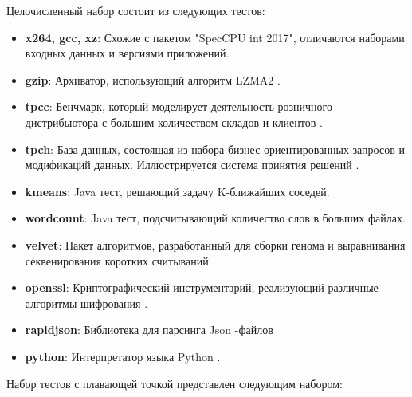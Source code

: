 Целочисленный набор состоит из следующих тестов:
\begin{itemize}
	\item  \textbf{x264, gcc, xz}: Схожие с пакетом "SpecCPU int 2017"\phantom{}, отличаются наборами входных данных и версиями приложений.
	\item  \textbf{gzip}: Архиватор, использующий алгоритм LZMA2 \cite{akoguz2016comparison}.
	\item  \textbf{tpcc}: Бенчмарк, который моделирует  деятельность розничного дистрибьютора с большим количеством складов и клиентов \cite{leutenegger1993modeling}.
	\item  \textbf{tpch}: База данных, состоящая из набора бизнес-ориентированных запросов и модификаций данных. Иллюстрируется система принятия решений \cite{barata2015overview}.
	\item  \textbf{kmeans}: Java тест, решающий задачу K-ближайших соседей.
	\item  \textbf{wordcount}: Java тест, подсчитывающий количество слов в больших файлах. 
	\item  \textbf{velvet}: Пакет алгоритмов, разработанный для сборки генома и выравнивания секвенирования коротких считываний \cite{zerbino2008velvet}. 
	\item  \textbf{openssl}: Криптографический инструментарий, реализующий различные алгоритмы шифрования \cite{rescorla2001introduction}.
	\item  \textbf{rapidjson}: Библиотека для парсинга Json -файлов \cite{keiser2023demand}
	\item  \textbf{python}: Интерпретатор языка Python \cite{python2021python}.
\end{itemize}
Набор тестов с плавающей точкой представлен следующим набором:
